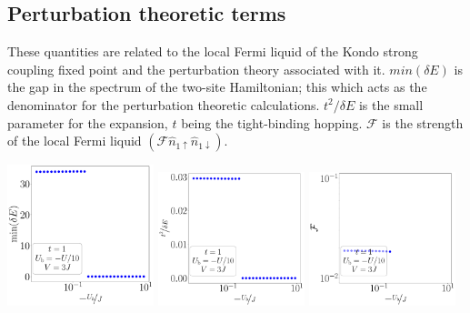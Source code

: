\documentclass[10pt]{report}
\numberwithin{equation}{section}
\begin{document}
\subsection*{Perturbation theoretic terms}
These quantities are related to the local Fermi liquid of the Kondo strong coupling fixed point and the perturbation theory associated with it. \(min(\delta E)\) is the gap in the spectrum of the two-site Hamiltonian; this which acts as the denominator for the perturbation theoretic calculations. \(t^2/\delta E\) is the small parameter for the expansion, \(t\) being the tight-binding hopping. \(\mathcal{F}\) is the strength of the local Fermi liquid \((\mathcal{F} \hat n_{1 \uparrow} \hat n_{1 \downarrow})\).
\begin{center}
	\includegraphics[width=0.32\textwidth]{../figures/gap-t=1.000,J=10.000,0.000,30,V=3J,Ubath=-U_by_10,N=6,U=1.000,889.513,30.pdf}
	\includegraphics[width=0.32\textwidth]{../figures/par-t=1.000,J=10.000,0.000,30,V=3J,Ubath=-U_by_10,N=6,U=1.000,889.513,30.pdf}
	\includegraphics[width=0.32\textwidth]{../figures/lfl-t=1.000,J=10.000,0.000,30,V=3J,Ubath=-U_by_10,N=6,U=1.000,889.513,30.pdf}
\end{center}
\end{document}
